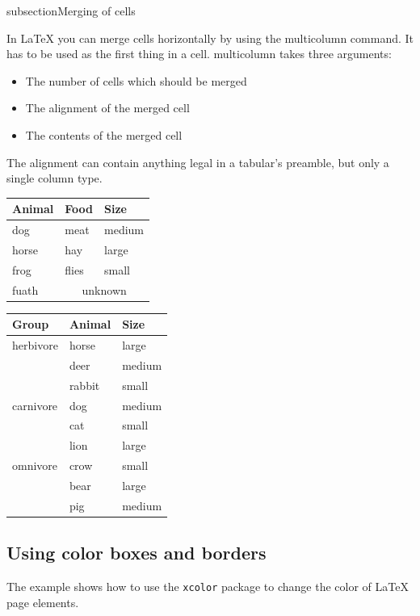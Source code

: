 \documentclass[12]{article}
\begin{document}
    subsection{Merging of cells}

    In LaTeX you can merge cells horizontally by using the multicolumn command. It has to be used as the first thing in a cell. multicolumn takes three arguments:

    \begin{itemize}
        \item The number of cells which should be merged
        \item The alignment of the merged cell
        \item The contents of the merged cell
    \end{itemize}

    The alignment can contain anything legal in a tabular’s preamble, but only a single column type.

    \begin{tabular}{lll}
      \toprule
      Animal & Food  & Size   \\
      \midrule
      dog    & meat  & medium \\
      horse  & hay   & large  \\
      frog   & flies & small  \\
      fuath  & \multicolumn{2}{c}{unknown} \\
      \bottomrule
    \end{tabular}

    \begin{tabular}{lll}
      \toprule
      Group     & Animal & Size   \\
      \midrule
      herbivore & horse  & large  \\
                & deer   & medium \\
                & rabbit & small  \\
      \addlinespace
      carnivore & dog    & medium \\
                & cat    & small  \\
                & lion   & large  \\
      \addlinespace
      omnivore  & crow   & small  \\
                & bear   & large  \\
                & pig    & medium \\
      \bottomrule
    \end{tabular}

    \subsection{Using color boxes and borders}
    The example shows how to use the \texttt{xcolor} package 
    to change the color of \LaTeX{} page elements.
\end{document}
